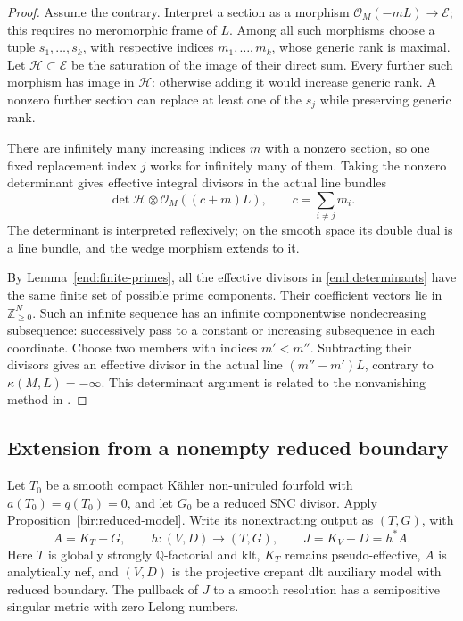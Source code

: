 \documentclass[11pt,letterpaper]{article}
\newcommand{\Q}{\mathbb{Q}}
\newcommand{\Z}{\mathbb{Z}}
\newcommand{\OO}{\mathcal{O}}
\theoremstyle{definition}
\theoremstyle{remark}
\begin{document}
\begin{proof}
Assume the contrary. Interpret a section as a morphism
\(\OO_M(-mL)\to\mathcal E\); this requires no meromorphic frame
of \(L\). Among all such morphisms choose a tuple
\(s_1,\ldots,s_k\), with respective indices \(m_1,\ldots,m_k\),
whose generic rank is maximal. Let \(\mathcal H\subset\mathcal E\)
be the saturation of the image of their direct sum. Every further
such morphism has image in \(\mathcal H\): otherwise adding it
would increase generic rank. A nonzero further section can replace
at least one of the \(s_j\) while preserving generic rank.

There are infinitely many increasing indices \(m\) with a nonzero
section, so one fixed replacement index \(j\) works for infinitely
many of them. Taking the nonzero determinant gives effective integral
divisors in the actual line bundles
\begin{equation}\label{end:determinants}
 \det\mathcal H\otimes\OO_M((c+m)L),
 \qquad c=\sum_{i\ne j}m_i.
\end{equation}
The determinant is interpreted reflexively; on the smooth space its
double dual is a line bundle, and the wedge morphism extends to it.

By Lemma~\ref{end:finite-primes}, all the effective divisors in
\eqref{end:determinants} have the same finite set of possible prime
components. Their coefficient vectors lie in \(\Z_{\ge0}^{N}\).
Such an infinite sequence has an infinite componentwise
nondecreasing subsequence: successively pass to a constant or
increasing subsequence in each coordinate. Choose two members with
indices \(m'<m''\). Subtracting their divisors gives an effective
divisor in the actual line \((m''-m')L\), contrary to
\(\kappa(M,L)=-\infty\). This determinant argument is related to
the nonvanishing method in \cite{HLLNonvanishing}.
\end{proof}

\subsection{Extension from a nonempty reduced boundary}

Let \(T_0\) be a smooth compact K\"ahler non-uniruled fourfold
with \(a(T_0)=q(T_0)=0\), and let \(G_0\) be a reduced SNC
divisor. Apply Proposition~\ref{bir:reduced-model}. Write its
nonextracting output as \((T,G)\), with
\[
 A=K_T+G,
 \qquad h:(V,D)\longrightarrow(T,G),
 \qquad J=K_V+D=h^*A.
\]
Here \(T\) is globally strongly \(\Q\)-factorial and klt,
\(K_T\) remains pseudo-effective, \(A\) is analytically nef,
and \((V,D)\) is the projective crepant dlt auxiliary model with
reduced boundary. The pullback of \(J\) to a smooth resolution
has a semipositive singular metric with zero Lelong numbers.
\end{document}
